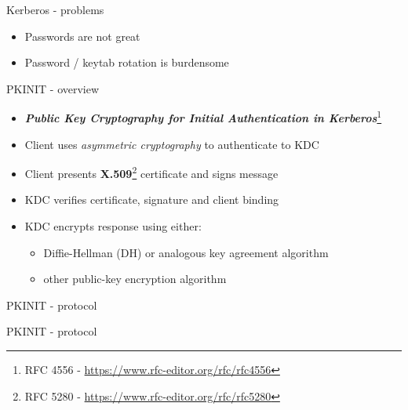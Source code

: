\documentclass[ignorenonframetext,aspectratio=169,12pt]{beamer}
\def\svgwidth{4cm}
\begin{document}
\begin{frame}{Kerberos - problems}
\protect\hypertarget{kerberos-problems}{}

\begin{itemize}
    \item Passwords are not great
    \item Password / keytab rotation is burdensome
\end{itemize}

\end{frame}


\begin{frame}{PKINIT - overview}
\protect\hypertarget{pkinit-overview}{}
\begin{itemize}
    \item \textbf{\em Public Key Cryptography for Initial Authentication in
        Kerberos}\footnote{RFC 4556 - \url{https://www.rfc-editor.org/rfc/rfc4556}}
    \item Client uses {\em asymmetric cryptography} to authenticate to KDC
    \item Client presents
        {\bf X.509}\footnote{RFC 5280 - \url{https://www.rfc-editor.org/rfc/rfc5280}}
        certificate and signs message
    \item KDC verifies certificate, signature and client binding
    \item KDC encrypts response using either:
        \begin{itemize}
            \item Diffie-Hellman (DH) or analogous key agreement algorithm
            \item other public-key encryption algorithm
        \end{itemize}
\end{itemize}
\end{frame}

\begin{frame}{PKINIT - protocol}
\begin{center}
\def\svgwidth{\textwidth}

\end{center}
\end{frame}

\begin{frame}{PKINIT - protocol}
\begin{center}
\def\svgwidth{\textwidth}

\end{center}
\end{frame}
\end{document}
